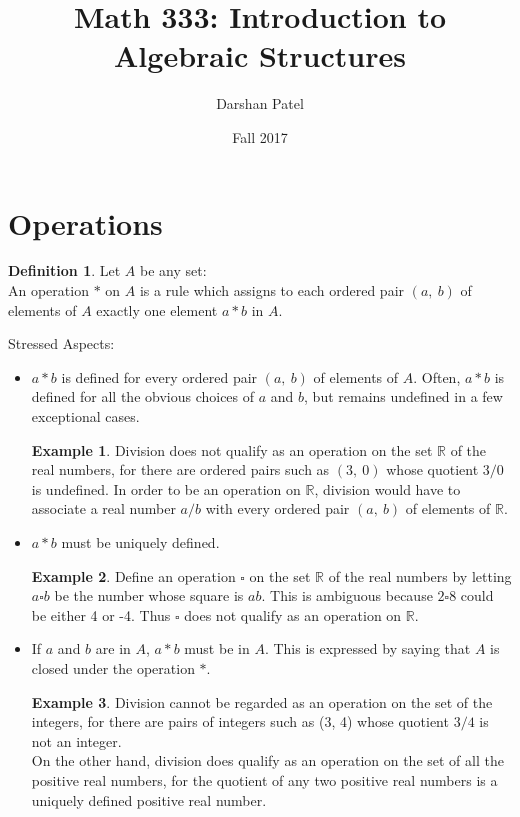 \documentclass[12pt]{article}
\renewcommand{\times}{\ast}
\newcommand{\reals}{\mathds{R}}
\begin{document}
\theoremstyle{definition}
\newtheorem{theorem}{Theorem}[section]
\newtheorem{definition}{Definition}[section]
\newtheorem{example}{Example}[section]

\title{Math 333: Introduction to Algebraic Structures}
\author{Darshan Patel}
\date{Fall 2017}
\maketitle

\tableofcontents



\section{Operations} 
\begin{definition} Let $A$ be any set: \\ An operation $\times$ on $A$ is a rule which assigns to each ordered pair $(a, ~b)$ of elements of $A$ exactly one element $a \times b$ in $A$. \end{definition}

Stressed Aspects: \begin{itemize} 
\item $a \times b$ is defined for every ordered pair $(a, ~b)$ of elements of $A$. Often, $a \times b$ is defined for all the obvious choices of $a$ and $b$, but remains undefined in a few exceptional cases. 

\begin{example} Division does not qualify as an operation on the set $ \reals $ of the real numbers, for there are ordered pairs such as $(3, ~0)$ whose quotient $3/0$ is undefined. In order to be an operation on $\reals$, division would have to associate a real number $a/b$ with every ordered pair $(a, ~b)$ of elements of $\reals$. \end{example} 

\item $a \times b$ must be uniquely defined. 

\begin{example} Define an operation $\square$ on the set $\reals$ of the real numbers by letting $a \square b$ be the number whose square is $ab$. This is ambiguous because $2 \square 8$ could be either 4 or -4. Thus $\square$ does not qualify as an operation on $\reals$. \end{example}

\item If $a$ and $b$ are in $A$, $a \times b$ must be in $A$. This is expressed by saying that $A$ is closed under the operation $\times$. 

\begin{example} Division cannot be regarded as an operation on the set of the integers, for there are pairs of integers such as (3, 4) whose quotient $3/4$ is not an integer. \\ On the other hand, division does qualify as an operation on the set of all the positive real numbers, for the quotient of any two positive real numbers is a uniquely defined positive real number. \end{example}

\end{itemize}
\end{document}
